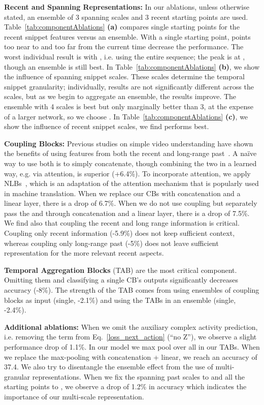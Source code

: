 \documentclass[runningheads]{llncs}
\makeatletter
\newcommand*{\eg}{e.g.\@\xspace}
\newcommand*{\ie}{i.e.\@\xspace}
\makeatother
\begin{document}
\textbf{Recent and Spanning Representations:}
In our ablations, unless otherwise stated, an ensemble of 3 spanning scales  and 3 recent starting points  are used.  Table~\ref{tab:componentAblations} \textbf{(a)} compares single starting points for the recent snippet features versus an ensemble. With a single starting point, points too near to and too far from the current time decrease the performance. The worst individual result is with , \ie using the entire sequence; the peak is at , though an ensemble is still best. In Table~\ref{tab:componentAblations} \textbf{(b)}, we show the influence of spanning snippet scales. These scales determine the temporal snippet granularity; individually, results are not significantly different across the scales, but as we begin to aggregate an ensemble, the results improve. The ensemble with 4 scales is best but only marginally better than 3, at the expense of a larger network, so we choose . In Table~\ref{tab:componentAblations} \textbf{(c)}, we show the influence of recent snippet scales, we find  performs best.
 
\textbf{Coupling Blocks:} Previous studies on simple video understanding have shown the benefits of using features from both the recent and long-range past~\cite{li2017temporal,lfb2019}. A na\"ive way to use both is to simply concatenate, though combining the two in a learned way, \eg via attention, is superior (+6.4\%). To incorporate attention, we apply NLBs~\cite{wang2018non}, which is an adaptation of the attention mechanism that is popularly used in machine translation. When we replace our CBs with concatenation and a linear layer, there is a drop of 6.7\%. When we do not use coupling but separately pass the  and  through concatenation and a linear layer, there is a drop of 7.5\%. We find also that coupling the recent  and long range  information is critical. Coupling only recent information (-5.9\%) does not keep sufficient context, whereas coupling only long-range past (-5\%) does not leave sufficient representation for the more relevant recent aspects. 

\textbf{Temporal Aggregation Blocks} (TAB) are the most critical component. Omitting them and classifying a single CB's outputs significantly decreases accuracy (-8\%). The strength of the TAB comes from using ensembles of coupling blocks as input (single, -2.1\%) and using the TABs in an ensemble (single, -2.4\%). 
 
\textbf{Additional ablations:} When we omit the auxiliary complex activity prediction, \ie removing the  term from Eq.~\ref{loss_next_action} (``no Z''), we observe a slight performance drop of 1.1\%. In our model we max pool over all  in our TABs. When we replace the max-pooling with concatenation + linear, we reach an accuracy of 37.4.
We also try to disentangle the ensemble effect from the use of multi-granular representations. When we fix the spanning past scales  to  and all the starting points to , we observe a drop of 1.2\% in accuracy which indicates the importance of our multi-scale representation.
\end{document}

